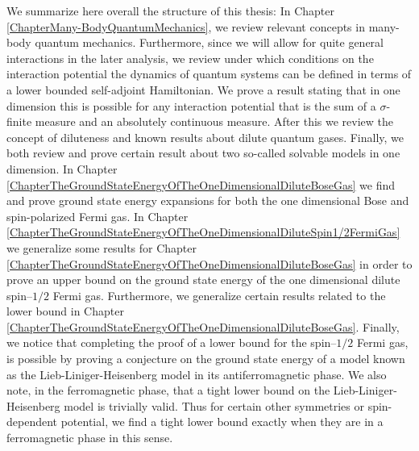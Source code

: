 We summarize here overall the structure of this thesis: In Chapter \ref{ChapterMany-BodyQuantumMechanics}, we review relevant concepts in many-body quantum mechanics. Furthermore, since we will allow for quite general interactions in the later analysis, we review under which conditions on the interaction potential the dynamics of quantum systems can be defined in terms of a lower bounded self-adjoint Hamiltonian. We prove a result stating that in one dimension this is possible for any interaction potential that is the sum of a $ \sigma $-finite measure and an absolutely continuous measure. After this we review the concept of diluteness and known results about dilute quantum gases. Finally, we both review and prove certain result about two so-called solvable models in one dimension. In Chapter \ref{ChapterTheGroundStateEnergyOfTheOneDimensionalDiluteBoseGas} we find and prove ground state energy expansions for both the one dimensional Bose and spin-polarized Fermi gas. In Chapter \ref{ChapterTheGroundStateEnergyOfTheOneDimensionalDiluteSpin1/2FermiGas} we generalize some results for Chapter \ref{ChapterTheGroundStateEnergyOfTheOneDimensionalDiluteBoseGas} in order to prove an upper bound on the ground state energy of the one dimensional dilute spin--$ 1/2 $ Fermi gas. Furthermore, we generalize certain results related to the lower bound in Chapter \ref{ChapterTheGroundStateEnergyOfTheOneDimensionalDiluteBoseGas}. Finally, we notice that completing the proof of a lower bound for the spin--$ 1/2 $ Fermi gas, is possible by proving a conjecture on the ground state energy of a model known as the Lieb-Liniger-Heisenberg model in its antiferromagnetic phase. We also note, in the ferromagnetic phase, that a tight lower bound on the Lieb-Liniger-Heisenberg model is trivially valid. Thus for certain other symmetries or spin-dependent potential, we find a tight lower bound exactly when they are in a ferromagnetic phase in this sense.

